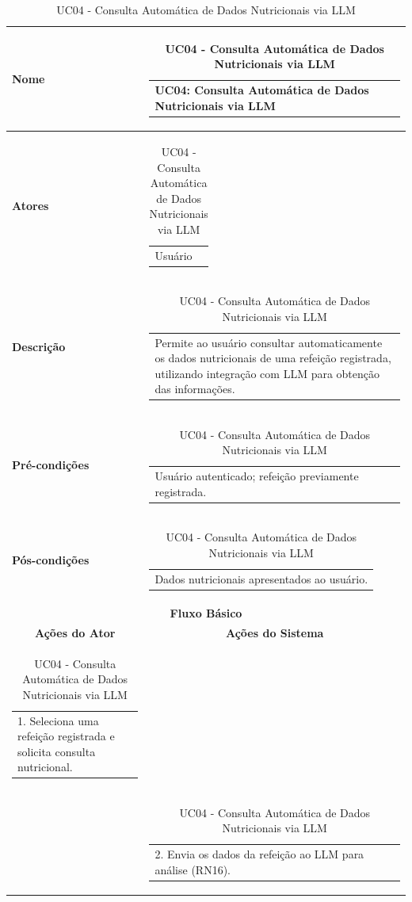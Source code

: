 \begin{longtable}[c]{|p{}|p{}|}
\caption{UC04 - Consulta Automática de Dados Nutricionais via LLM}
\label{tab:uc04}\\
\hline
\multicolumn{1}{|p{0.48\textwidth}|}{\textbf{Nome}} &
  \begin{tabular}[c]{@{}p{}@{}}UC04: Consulta Automática de Dados Nutricionais via LLM\end{tabular} \\ \hline
\endfirsthead
\endhead

\multicolumn{1}{|p{0.48\textwidth}|}{\textbf{Atores}} &
  \begin{tabular}[c]{@{}p{}@{}}Usuário\end{tabular} \\ \hline
\multicolumn{1}{|p{0.48\textwidth}|}{\textbf{Descrição}} &
  \begin{tabular}[c]{@{}p{}@{}}Permite ao usuário consultar automaticamente os dados nutricionais de uma refeição registrada, utilizando integração com LLM para obtenção das informações.\end{tabular} \\ \hline
\multicolumn{1}{|p{0.48\textwidth}|}{\textbf{Pré-condições}} &
  \begin{tabular}[c]{@{}p{}@{}}Usuário autenticado; refeição previamente registrada.\end{tabular} \\ \hline
\multicolumn{1}{|p{0.48\textwidth}|}{\textbf{Pós-condições}} &
  \begin{tabular}[c]{@{}p{}@{}}Dados nutricionais apresentados ao usuário.\end{tabular} \\ \hline
\multicolumn{2}{|c|}{\textbf{Fluxo Básico}} \\ \hline
\multicolumn{1}{|c|}{\textbf{Ações do Ator}} &
  \multicolumn{1}{c|}{\textbf{Ações do Sistema}} \\ \hline
\multicolumn{1}{|p{0.48\textwidth}|}{\begin{tabular}[c]{@{}p{}@{}}1. Seleciona uma refeição registrada e solicita consulta nutricional.\end{tabular}} & \\ \hline
\multicolumn{1}{|p{0.48\textwidth}|}{} &
  \begin{tabular}[c]{@{}p{}@{}}2. Envia os dados da refeição ao LLM para análise (RN16).\end{tabular} \\ \hline

\end{longtable}
